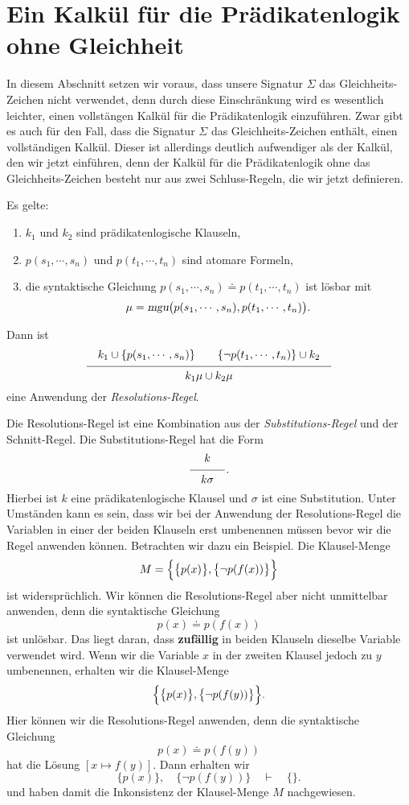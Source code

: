 \section{Ein Kalk\"{u}l f\"{u}r die Pr\"{a}dikatenlogik ohne Gleichheit}
In diesem Abschnitt setzen wir voraus, dass unsere Signatur $\Sigma$ das Gleichheits-Zeichen nicht
verwendet, denn durch diese Einschr\"{a}nkung wird es wesentlich leichter, einen vollst\"{a}ngen Kalk\"{u}l f\"{u}r
die Pr\"{a}dikatenlogik einzuf\"{u}hren.  Zwar gibt es auch f\"{u}r den Fall, dass die Signatur $\Sigma$ das
Gleichheits-Zeichen enth\"{a}lt, einen vollst\"{a}ndigen Kalk\"{u}l.  Dieser ist allerdings deutlich
aufwendiger als der Kalk\"{u}l, den wir jetzt einf\"{u}hren,  denn der Kalk\"{u}l f\"{u}r die Pr\"{a}dikatenlogik ohne
das Gleichheits-Zeichen besteht nur aus zwei Schluss-Regeln, die wir jetzt definieren.
\begin{Definition}[Resolution] 
    Es gelte:
    \begin{enumerate}
    \item $k_1$ und $k_2$ sind pr\"{a}dikatenlogische Klauseln,
    \item $p(s_1,\cdots,s_n)$ und $p(t_1,\cdots,t_n)$ sind atomare Formeln,
    \item die syntaktische Gleichung $p(s_1,\cdots,s_n)  \doteq p(t_1,\cdots,t_n)$ ist l\"{o}sbar mit 
          \[ \mu = \textsl{mgu}\bigl(p(s_1,\cdots,s_n), p(t_1,\cdots,t_n)\bigr). \]
    \end{enumerate}
     Dann ist 
     \[ \schluss{k_1 \cup\{ p(s_1,\cdots,s_n)\} \quad\quad \{\neg p(t_1,\cdots,t_n)\} \cup k_2}{
                 k_1\mu \cup k_2\mu} 
     \]
     eine Anwendung der \emph{Resolutions-Regel}.
     \eox
\end{Definition}
Die Resolutions-Regel ist eine Kombination aus der \emph{Substitutions-Regel} und der 
Schnitt-Regel.  Die Substitutions-Regel hat die Form
\[ \schluss{k}{k\sigma}. \]
Hierbei ist $k$ eine pr\"{a}dikatenlogische Klausel und $\sigma$ ist eine Substitution.
Unter Umst\"{a}nden kann es sein, dass wir bei der Anwendung der Resolutions-Regel 
die Variablen in einer der beiden Klauseln erst umbenennen
m\"{u}ssen bevor wir die Regel anwenden k\"{o}nnen.  Betrachten wir dazu ein Beispiel.
Die Klausel-Menge 
\[ M = \Bigl\{ \bigl\{ p(x) \bigr\}, \bigl\{ \neg p(f(x)) \bigr\} \Bigr\} \]
ist widerspr\"{u}chlich.  Wir k\"{o}nnen die Resolutions-Regel aber nicht unmittelbar anwenden,
denn die syntaktische Gleichung 
\[ p(x) \doteq p(f(x)) \]
ist unl\"{o}sbar.  Das liegt daran, dass \textbf{zuf\"{a}llig} in beiden Klauseln dieselbe Variable
verwendet wird.  Wenn wir die Variable $x$ in der zweiten Klausel jedoch zu $y$ umbenennen, erhalten
wir die Klausel-Menge 
\[ \Bigl\{ \bigl\{ p(x) \bigr\}, \bigl\{ \neg p(f(y)) \bigr\} \Bigr\}. \]
Hier k\"{o}nnen wir die Resolutions-Regel anwenden, denn die syntaktische Gleichung 
\[ p(x) \doteq p(f(y)) \]
hat die L\"{o}sung $[x \mapsto f(y)]$.  Dann erhalten wir 
\[ \bigl\{ p(x) \bigr\}, \quad \bigl\{ \neg p(f(y)) \bigr\} \quad \vdash \quad \{\}. \]
und haben damit die Inkonsistenz der Klausel-Menge $M$ nachgewiesen.

